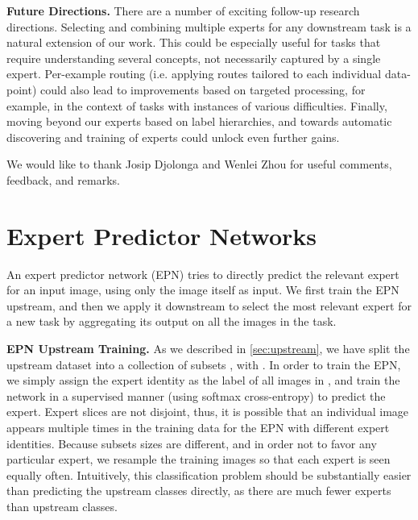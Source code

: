 \documentclass{article}
\begin{document}
\textbf{Future Directions.}
There are a number of exciting follow-up research directions.
Selecting and combining multiple experts for any downstream task is a natural extension of our work.
This could be especially useful for tasks that require understanding several concepts, not necessarily captured by a single expert.
Per-example routing (i.e. applying routes tailored to each individual data-point) could also lead to improvements based on targeted processing, for example, in the context of tasks with instances of various difficulties.
Finally, moving beyond our experts based on label hierarchies, and towards automatic discovering and training of experts could unlock even further gains. 


\begin{ack}
We would like to thank Josip Djolonga and Wenlei Zhou for useful comments, feedback, and remarks.
\end{ack}




\clearpage
\appendix

\section{Expert Predictor Networks}
\label{app:epn}
An expert predictor network (EPN) tries to directly predict the relevant expert
for an input image, using only the image itself as input.
We first train the EPN upstream, and then we apply it downstream to select the most relevant expert for a new task by aggregating its output on all the images in the task.

\textbf{EPN Upstream Training.} As we described in \cref{sec:upstream}, we have split the upstream dataset  into a
collection of subsets , with . 
In order to train the EPN, we simply assign the expert identity  as the label of all
images in , and train the network in a supervised manner (using softmax cross-entropy) to predict the expert.
Expert slices  are not disjoint, thus, it is
possible that an individual image appears multiple times in the training data for the EPN 
with different expert identities. Because subsets sizes are different, and in order not to favor any particular expert, we resample the training images so that each expert is seen equally often.
Intuitively, this classification problem should be substantially easier than predicting
the upstream classes  directly, as there are much fewer experts than upstream classes.
\end{document}
